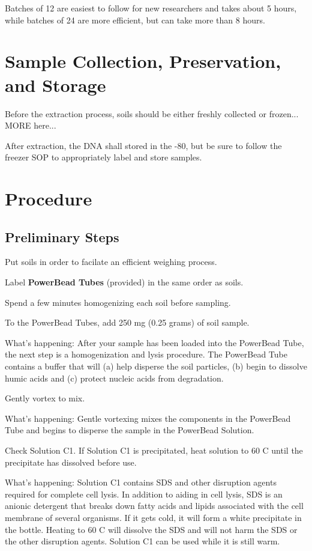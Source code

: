 \documentclass[12pt]{../SOP3_alpha}\usepackage[]{graphicx}\usepackage[]{color}
\begin{document}
\NP Batches of 12 are easiest to follow for new researchers and takes about 5 hours, while batches of 24 are more efficient, but can take more than 8 hours.

\section{Sample Collection, Preservation, and Storage}

\NP Before the extraction process, soils should be either freshly collected or frozen... MORE here...

\NP After extraction, the DNA shall stored in the -80\degree, but be sure to follow the freezer SOP to appropriately label and store samples.

\section{Procedure}

\subsection*{Preliminary Steps} 
 
\NP Put soils in order to facilate an efficient weighing process. 

\NP Label \textbf{PowerBead Tubes} (provided) in the same order as soils.

\NP Spend a few minutes homogenizing each soil before sampling.

\NP To the PowerBead Tubes, add 250 mg (0.25 grams) of soil sample.

\noindent What's happening: After your sample has been loaded into the PowerBead Tube, the next step is a homogenization and lysis procedure. The PowerBead
Tube contains a buffer that will (a) help disperse the soil particles, (b) begin to dissolve humic acids and (c) protect nucleic acids from degradation.

\NP Gently vortex to mix.

\noindent What's happening: Gentle vortexing mixes the components in the PowerBead Tube and begins to disperse the sample in the PowerBead Solution.

\NP Check Solution C1. If Solution C1 is precipitated, heat solution to 60 \degree C until the precipitate has dissolved before use.

\NP What's happening: Solution C1 contains SDS and other disruption agents required for complete cell lysis. In addition to aiding in cell lysis, SDS is an anionic detergent that breaks down fatty acids and lipids associated with the cell membrane of several organisms. If it gets cold, it will form a white precipitate in the bottle. Heating to 60 \degree C will dissolve the SDS and will not harm the SDS or the other disruption agents. Solution C1 can be used while it is still warm.
\end{document}
